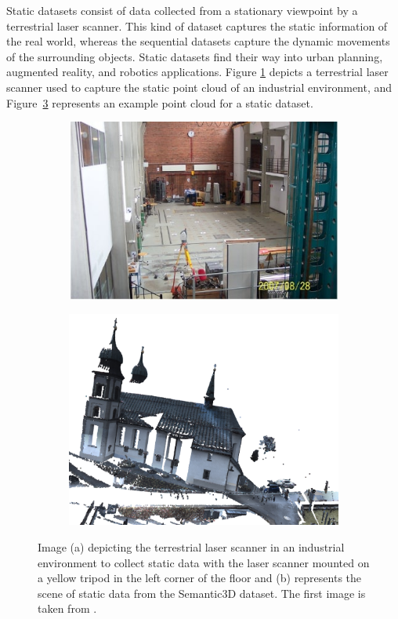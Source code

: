     Static datasets consist of data collected from a stationary viewpoint by a terrestrial laser scanner.
    This kind of dataset captures the static information of the real world, whereas the sequential datasets capture the dynamic movements of the surrounding objects.
    Static datasets find their way into urban planning, augmented reality, and robotics applications. 
    Figure \ref{fig:tls} depicts a terrestrial laser scanner used to capture the static point cloud of an industrial environment, and Figure~\ref{fig:static_scan} represents an example point cloud for a static dataset.
    \begin{figure}[h!]
        \centering
        \begin{subfigure}{0.45\textwidth}
            \includegraphics[scale=0.45]{images/TLS.jpg}
            \caption{}
            \label{fig:tls}
        \end{subfigure}
        \begin{subfigure}{0.45\textwidth}
            \centering
            \includegraphics[scale=0.2]{images/sem3d_data/1.pdf}
            \caption{}
            \label{fig:static_scan}
        \end{subfigure}

        \caption{	Image (a) depicting the terrestrial laser scanner in an industrial environment to collect static data with the laser scanner mounted on a yellow tripod in the left corner of the floor and 
        (b) represents the scene of static data from the Semantic3D dataset. The first image is taken from \cite{tls}.}
       
    \end{figure}

